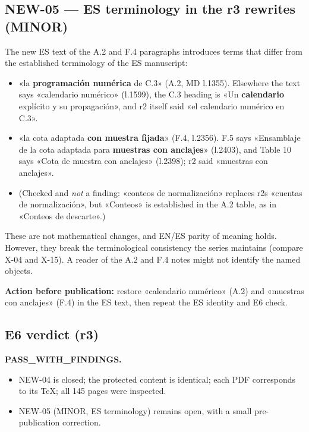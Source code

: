 \documentclass[
]{article}
\providecommand{\tightlist}{%
  \setlength{\itemsep}{0pt}\setlength{\parskip}{0pt}}
\begin{document}
\subsection{NEW-05 --- ES terminology in the r3 rewrites
(MINOR)}\label{new-05--es-terminology-in-the-r3-rewrites-minor}

The new ES text of the A.2 and F.4 paragraphs introduces terms that
differ from the established terminology of the ES manuscript:

\begin{itemize}
\tightlist
\item
  «la \textbf{programación numérica} de C.3» (A.2, MD l.1355). Elsewhere
  the text says «calendario numérico» (l.1599), the C.3 heading is «Un
  \textbf{calendario} explícito y su propagación», and r2 itself said
  «el calendario numérico en C.3».
\item
  «la cota adaptada \textbf{con muestra fijada}» (F.4, l.2356). F.5 says
  «Ensamblaje de la cota adaptada para \textbf{muestras con anclajes}»
  (l.2403), and Table 10 says «Cota de muestra con anclajes» (l.2398);
  r2 said «muestras con anclajes».
\item
  (Checked and \emph{not} a finding: «conteos de normalización» replaces
  r2\textquotesingle s «cuentas de normalización», but «Conteos» is
  established in the A.2 table, as in «Conteos de descarte».)
\end{itemize}

These are not mathematical changes, and EN/ES parity of meaning holds.
However, they break the terminological consistency the series maintains
(compare X-04 and X-15). A reader of the A.2 and F.4 notes might not
identify the named objects.

\textbf{Action before publication:} restore «calendario numérico» (A.2)
and «muestras con anclajes» (F.4) in the ES text, then repeat the ES
identity and E6 check.

\subsection{E6 verdict (r3)}\label{e6-verdict-r3}

\textbf{PASS\_WITH\_FINDINGS.}

\begin{itemize}
\tightlist
\item
  NEW-04 is closed; the protected content is identical; each PDF
  corresponds to its TeX; all 145 pages were inspected.
\item
  NEW-05 (MINOR, ES terminology) remains open, with a small
  pre-publication correction.
\end{itemize}
\end{document}
